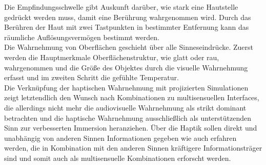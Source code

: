 Die Empfindungsschwelle gibt Auskunft darüber, wie stark eine Hautstelle gedrückt werden muss, damit eine Berührung wahrgenommen wird. Durch das Berühren der Haut mit zwei Tastpunkten in bestimmter Entfernung kann das räumliche Auflösungsvermögen bestimmt werden. \cite[Vgl. Seite 28]{Sprenger.2020}\\
Die Wahrnehmung von Oberflächen geschieht über alle Sinneseindrücke. Zuerst werden die Hauptmerkmale Oberflächenstruktur, wie glatt oder rau, wahrgenommen und die Größe des Objektes durch die visuelle Wahrnehmung erfasst und im zweiten Schritt die gefühlte Temperatur. \cite[Vgl. Seite 33]{Sprenger.2020}\\
\glqq Die Verknüpfung der haptischen Wahrnehmung mit projizierten Simulationen zeigt letztendlich den Wunsch nach Kombinationen zu multisensuellen Interfaces, die allerdings nicht mehr die audiovisuelle Wahrnehmung als strikt dominant betrachten und die haptische Wahrnehmung ausschließlich als unterstützenden Sinn zur verbesserten Immersion heranziehen. Über die Haptik sollen direkt und unabhängig von anderen Sinnen Informationen gegeben wie auch erfahren werden, die in Kombination mit den anderen Sinnen kräftigere Informationsträger sind und somit auch als multisensuelle Kombinationen erforscht werden. \grqq{} \cite[Seite 263]{Sprenger.2020}
